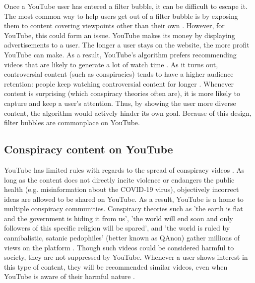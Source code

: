 \documentclass[../main.tex]{subfiles}
\begin{document}
Once a YouTube user has entered a filter bubble, it can be difficult to escape it. The most common way to 
help users get out of a filter bubble is by exposing them to content covering viewpoints other than their own
\citep{bozdag2015breaking}. However, for YouTube, this could form an issue. YouTube makes its money by 
displaying advertisements to a user. The longer a user stays on the website, the more profit YouTube can 
make. As a result, YouTube's algorithm prefers recommending videos that are likely to generate a lot of watch
time \citep{maack_2019}. As it turns out, controversial content (such as conspiracies) tends to have a higher
audience retention: people keep watching controversial content for longer \citep{birch2019white}. Whenever 
content is surprising (which conspiracy theories often are), it is more likely to capture and keep a user's 
attention. Thus, by showing the user more diverse content, the algorithm would actively hinder its own goal.
Because of this design, filter bubbles are commonplace on YouTube. 

\subsection{Conspiracy content on YouTube}
YouTube has limited rules with regards to the spread of conspiracy videos \citep{youtube_2021}. As long
as the content does not directly incite violence or endangers the public health (e.g. misinformation
about the COVID-19 virus), objectively incorrect ideas are allowed to be shared on YouTube. As a result,
YouTube is a home to multiple conspiracy communities. Conspiracy theories such as 'the earth is flat and
the government is hiding it from us', 'the world will end soon and only followers of this specific
religion will be spared', and 'the world is ruled by cannibalistic, satanic pedophiles' (better known as
QAnon) gather millions of views on the platform \citep{paolillo2018flat, miller2021characterizing}.
Though such videos could be considered harmful to society, they are not suppressed by YouTube. Whenever
a user shows interest in this type of content, they will be recommended similar videos, even when
YouTube is aware of their harmful nature \citep{ledwich2019algorithmic, maack_2019}.
\end{document}
